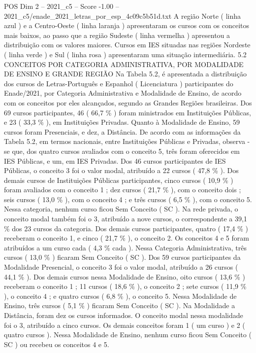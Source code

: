 \begin{textsample}{POS Dim 2 – 2021\_c5 – Score -1.00 – 2021\_c5/enade\_2021\_letras\_por\_esp\_4c09c5b51d.txt}
A região Norte ( linha azul ) e a Centro-Oeste ( linha laranja ) apresentaram os cursos com os conceitos mais baixos, ao passo que a região Sudeste ( linha vermelha ) apresentou a distribuição com os valores maiores.
Cursos em IES situadas nas regiões Nordeste ( linha verde ) e Sul ( linha rosa ) apresentaram uma situação intermediária. 5.2 CONCEITOS POR CATEGORIA ADMINISTRATIVA, POR MODALIDADE DE ENSINO E GRANDE REGIÃO Na Tabela 5.2, é apresentada a distribuição dos cursos de Letras-Português e Espanhol ( Licenciatura ) participantes do Enade/2021, por Categoria Administrativa e Modalidade de Ensino, de acordo com os conceitos por eles alcançados, segundo as Grandes Regiões brasileiras.
Dos 69 cursos participantes, 46 ( 66,7 \% ) foram ministrados em Instituições Públicas, e 23 ( 33,3 \% ), em Instituições Privadas.
Quanto à Modalidade de Ensino, 59 cursos foram Presenciais, e dez, a Distância.
De acordo com as informações da Tabela 5.2, em termos nacionais, entre Instituições Públicas e Privadas, observa -se que, dos quatro cursos avaliados com o conceito 5, três foram oferecidos em IES Públicas, e um, em IES Privadas.
Dos 46 cursos participantes de IES Públicas, o conceito 3 foi o valor modal, atribuído a 22 cursos ( 47,8 \% ).
Dos demais cursos de Instituições Públicas participantes, cinco cursos ( 10,9 \% ) foram avaliados com o conceito 1 ; dez cursos ( 21,7 \% ), com o conceito dois ; seis cursos ( 13,0 \% ), com o conceito 4 ; e três cursos ( 6,5 \% ), com o conceito 5.
Nessa categoria, nenhum curso ficou Sem Conceito ( SC ).
Na rede privada, o conceito modal também foi o 3, atribuído a nove cursos, o correspondente a 39,1 \% dos 23 cursos da categoria.
Dos demais cursos participantes, quatro ( 17,4 \% ) receberam o conceito 1, e cinco ( 21,7 \% ), o conceito 2.
Os conceitos 4 e 5 foram atribuídos a um curso cada ( 4,3 \% cada ).
Nessa Categoria Administrativa, três cursos ( 13,0 \% ) ficaram Sem Conceito ( SC ).
Dos 59 cursos participantes da Modalidade Presencial, o conceito 3 foi o valor modal, atribuído a 26 cursos ( 44,1 \% ).
Dos demais cursos nessa Modalidade de Ensino, oito cursos ( 13,6 \% ) receberam o conceito 1 ; 11 cursos ( 18,6 \% ), o conceito 2 ; sete cursos ( 11,9 \% ), o conceito 4 ; e quatro cursos ( 6,8 \% ), o conceito 5.
Nessa Modalidade de Ensino, três cursos ( 5,1 \% ) ficaram Sem Conceito ( SC ).
Na Modalidade a Distância, foram dez os cursos informados.
O conceito modal nessa modalidade foi o 3, atribuído a cinco cursos.
Os demais conceitos foram 1 ( um curso ) e 2 ( quatro cursos ).
Nessa Modalidade de Ensino, nenhum curso ficou Sem Conceito ( SC ) ou recebeu os conceitos 4 e 5.

\end{textsample}
